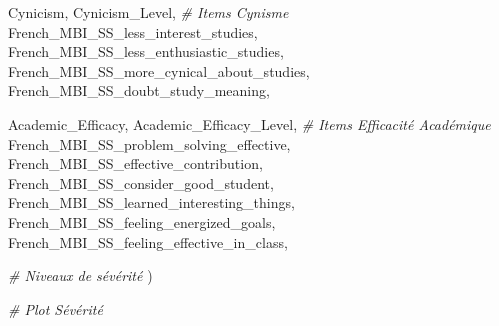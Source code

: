 \documentclass[
]{article}
\newenvironment{Shaded}{\begin{snugshade}}{\end{snugshade}}
\newcommand{\CommentTok}[1]{\textcolor[rgb]{0.56,0.35,0.01}{\textit{#1}}}
\newcommand{\NormalTok}[1]{#1}
\begin{document}
\begin{Shaded}
\begin{Highlighting}[]
\NormalTok{    Cynicism,}
\NormalTok{    Cynicism\_Level,}
    \CommentTok{\# Items Cynisme}
\NormalTok{    French\_MBI\_SS\_less\_interest\_studies,}
\NormalTok{    French\_MBI\_SS\_less\_enthusiastic\_studies,}
\NormalTok{    French\_MBI\_SS\_more\_cynical\_about\_studies,}
\NormalTok{    French\_MBI\_SS\_doubt\_study\_meaning,}
    
\NormalTok{    Academic\_Efficacy,}
\NormalTok{    Academic\_Efficacy\_Level,}
    \CommentTok{\# Items Efficacité Académique}
\NormalTok{    French\_MBI\_SS\_problem\_solving\_effective,}
\NormalTok{    French\_MBI\_SS\_effective\_contribution,}
\NormalTok{    French\_MBI\_SS\_consider\_good\_student,}
\NormalTok{    French\_MBI\_SS\_learned\_interesting\_things,}
\NormalTok{    French\_MBI\_SS\_feeling\_energized\_goals,}
\NormalTok{    French\_MBI\_SS\_feeling\_effective\_in\_class,}
    
    \CommentTok{\# Niveaux de sévérité}
\NormalTok{    )}

\CommentTok{\# Plot Sévérité}



\end{Highlighting}
\end{Shaded}
\end{document}
